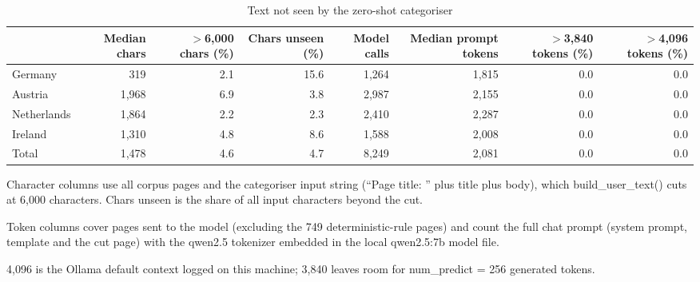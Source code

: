 \begin{table}[htbp]
\centering
\small
\begin{threeparttable}
\caption{Text not seen by the zero-shot categoriser}
\label{tab:unread-text}
\begin{tabular}{lrrrrrrr}
\hline
 & Median chars & $>$6,000 chars (\%) & Chars unseen (\%) & Model calls & Median prompt tokens & $>$3,840 tokens (\%) & $>$4,096 tokens (\%) \\
\hline
Germany & 319 & 2.1 & 15.6 & 1,264 & 1,815 & 0.0 & 0.0 \\
Austria & 1,968 & 6.9 & 3.8 & 2,987 & 2,155 & 0.0 & 0.0 \\
Netherlands & 1,864 & 2.2 & 2.3 & 2,410 & 2,287 & 0.0 & 0.0 \\
Ireland & 1,310 & 4.8 & 8.6 & 1,588 & 2,008 & 0.0 & 0.0 \\
\hline
Total & 1,478 & 4.6 & 4.7 & 8,249 & 2,081 & 0.0 & 0.0 \\
\hline
\end{tabular}
\begin{tablenotes}
\footnotesize
\item Character columns use all corpus pages and the categoriser input string (``Page title: '' plus title plus body), which build\_user\_text() cuts at 6,000 characters. Chars unseen is the share of all input characters beyond the cut.
\item Token columns cover pages sent to the model (excluding the 749 deterministic-rule pages) and count the full chat prompt (system prompt, template and the cut page) with the qwen2.5 tokenizer embedded in the local qwen2.5:7b model file.
\item 4,096 is the Ollama default context logged on this machine; 3,840 leaves room for num\_predict = 256 generated tokens.
\end{tablenotes}
\end{threeparttable}
\end{table}
